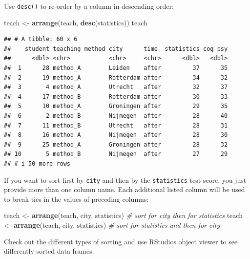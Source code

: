 \documentclass[
]{scrartcl}
\makeatletter
\newenvironment{Shaded}{\begin{snugshade}}{\end{snugshade}}
\newcommand{\CommentTok}[1]{\textcolor[rgb]{0.56,0.35,0.01}{\textit{#1}}}
\newcommand{\KeywordTok}[1]{\textcolor[rgb]{0.13,0.29,0.53}{\textbf{#1}}}
\newcommand{\NormalTok}[1]{#1}
\newcommand{\StringTok}[1]{\textcolor[rgb]{0.31,0.60,0.02}{#1}}
\newenvironment{kframe}{%
\medskip{}
\setlength{\fboxsep}{.8em}
 \def\at@end@of@kframe{}%
 \ifinner\ifhmode%
  \def\at@end@of@kframe{\end{minipage}}%
  \begin{minipage}{\columnwidth}%
 \fi\fi%
 \def\FrameCommand##1{\hskip\@totalleftmargin \hskip-\fboxsep
 \colorbox{shadecolor}{##1}\hskip-\fboxsep
     \hskip-\linewidth \hskip-\@totalleftmargin \hskip\columnwidth}%
 \MakeFramed {\advance\hsize-\width
   \@totalleftmargin\z@ \linewidth\hsize
   \@setminipage}}%
 {\par\unskip\endMakeFramed%
 \at@end@of@kframe}
\newenvironment{rmdblock}[1]
  {
  \begin{itemize}
  \renewcommand{\labelitemi}{
    \raisebox{-.7\height}[0pt][0pt]{
      {\setkeys{Gin}{width=3em,keepaspectratio}\texttt{[image: images/\#1]}}
    }
  }
  \setlength{\fboxsep}{1em}
  \begin{kframe}
  \item
  }
  {
  \end{kframe}
  \end{itemize}
  }
\newenvironment{myexercise}
    {\begin{rmdblock}{exercise_green}}
    {\end{rmdblock}}
\makeatother
\begin{document}
Use \texttt{desc()} to re-order by a column in descending order:

\begin{Shaded}
\begin{Highlighting}[]
\NormalTok{teach \textless{}{-}}\StringTok{ }\KeywordTok{arrange}\NormalTok{(teach, }\KeywordTok{desc}\NormalTok{(statistics))}
\NormalTok{teach}
\end{Highlighting}
\end{Shaded}

\begin{verbatim}
## # A tibble: 60 x 6
##    student teaching_method city      time  statistics cog_psy
##      <dbl> <chr>           <chr>     <chr>      <dbl>   <dbl>
##  1      28 method_A        Leiden    after         37      35
##  2      19 method_A        Rotterdam after         34      32
##  3       4 method_A        Utrecht   after         32      37
##  4      17 method_B        Rotterdam after         30      33
##  5      10 method_A        Groningen after         29      35
##  6       2 method_B        Nijmegen  after         28      40
##  7      11 method_B        Utrecht   after         28      31
##  8      16 method_A        Nijmegen  after         28      30
##  9      25 method_A        Groningen after         28      32
## 10       5 method_B        Nijmegen  after         27      29
## # i 50 more rows
\end{verbatim}

If you want to sort first by \texttt{city} and then by the \texttt{statistics} test score, you just provide more than one column name. Each additional listed column will be used to break ties in the values of preceding columns:

\begin{Shaded}
\begin{Highlighting}[]
\NormalTok{teach \textless{}{-}}\StringTok{ }\KeywordTok{arrange}\NormalTok{(teach, city, statistics) }\CommentTok{\# sort for city then for statistics}
\NormalTok{teach \textless{}{-}}\StringTok{ }\KeywordTok{arrange}\NormalTok{(teach, city, statistics) }\CommentTok{\# sort for statistics and then for city}
\end{Highlighting}
\end{Shaded}

\begin{myexercise}
Check out the different types of sorting and use RStudios object viewer
to see differently sorted data frames.
\end{myexercise}
\end{document}
